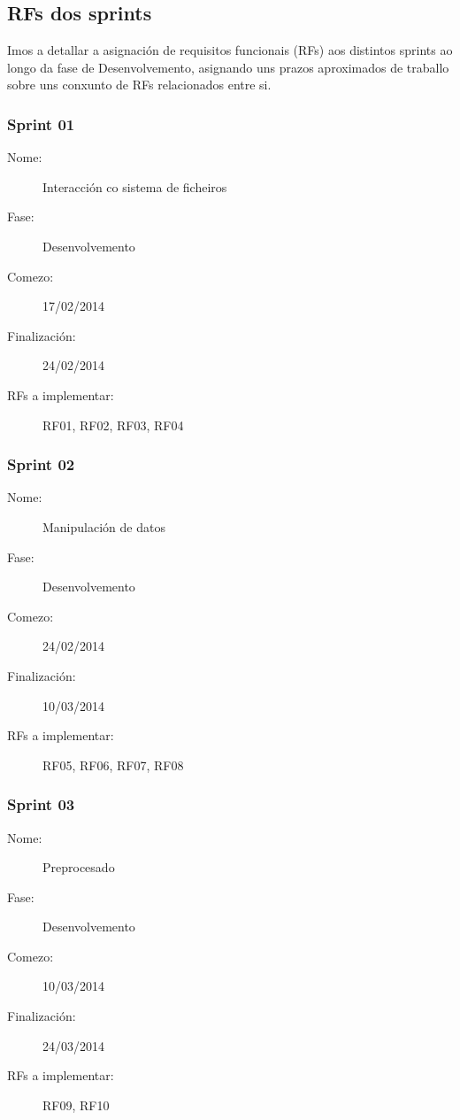 \subsection{RFs dos sprints}

Imos a detallar a asignación de requisitos funcionais (RFs) aos distintos sprints ao longo da fase de Desenvolvemento, asignando uns prazos aproximados de traballo sobre uns conxunto de RFs relacionados entre si.

\subsubsection*{Sprint 01}
\begin{description}
\item[Nome:] Interacción co sistema de ficheiros
\item[Fase:] Desenvolvemento
\item[Comezo:] 17/02/2014
\item[Finalización:] 24/02/2014
\item[RFs a implementar:] RF01, RF02, RF03, RF04
\end{description}

\subsubsection*{Sprint 02}
\begin{description}
\item[Nome:] Manipulación de datos
\item[Fase:] Desenvolvemento
\item[Comezo:] 24/02/2014
\item[Finalización:] 10/03/2014
\item[RFs a implementar:] RF05, RF06, RF07, RF08
\end{description}

\subsubsection*{Sprint 03}
\begin{description}
\item[Nome:] Preprocesado
\item[Fase:] Desenvolvemento
\item[Comezo:] 10/03/2014
\item[Finalización:] 24/03/2014
\item[RFs a implementar:] RF09, RF10
\end{description}

